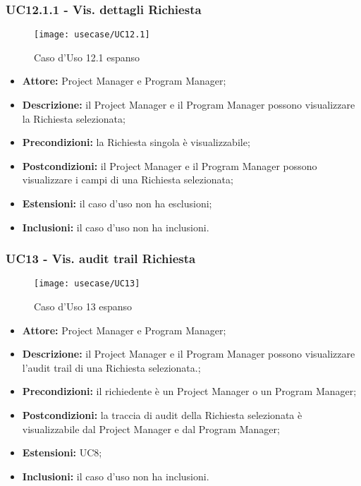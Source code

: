 \subsubsection*{UC12.1.1 - Vis. dettagli Richiesta}

\begin{figure}[H] 
    \centering 
    \texttt{[image: usecase/UC12.1]} 
    \caption{Caso d'Uso 12.1 espanso}
\end{figure}

\begin{itemize}[label=$\circ$]
\item \textbf{Attore:} Project Manager e Program Manager;
\item \textbf{Descrizione:} il Project Manager e il Program Manager possono visualizzare la Richiesta selezionata;
\item \textbf{Precondizioni:} la Richiesta singola è visualizzabile;
\item \textbf{Postcondizioni:} il Project Manager e il Program Manager possono visualizzare i campi di una Richiesta selezionata;
\item \textbf{Estensioni:} il caso d'uso non ha esclusioni;
\item \textbf{Inclusioni:} il caso d'uso non ha inclusioni.
\end{itemize}

\subsubsection*{UC13 - Vis. audit trail Richiesta}

\begin{figure}[H] 
    \centering 
    \texttt{[image: usecase/UC13]} 
    \caption{Caso d'Uso 13 espanso}
\end{figure}

\begin{itemize}[label=$\circ$]
\item \textbf{Attore:} Project Manager e Program Manager;
\item \textbf{Descrizione:} il Project Manager e il Program Manager possono visualizzare l'audit trail di una Richiesta selezionata.;
\item \textbf{Precondizioni:} il richiedente è un Project Manager o un Program Manager;
\item \textbf{Postcondizioni:} la traccia di audit della Richiesta selezionata è visualizzabile dal Project Manager e dal Program Manager;
\item \textbf{Estensioni:} UC8;
\item \textbf{Inclusioni:} il caso d'uso non ha inclusioni.
\end{itemize}

